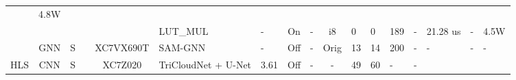 \begin{table}
\begin{adjustbox}{totalheight=\baselineskip,}
\begin{tabular}{ccccclp{2em}cp{3em}cp{2em}p{4em}p{3em}p{3.5em}p{3.5em}p{2.5em}p{3em}}
                                                               &\multirow{1}{*}{4.8W}\\
   &   &   &   &   &\multirow{1}{*}{LUT\_MUL}
                       &\multirow{1}{*}{-}
                           &\multirow{1}{*}{On}
                               &\multirow{1}{*}{-}
                                   &\multirow{1}{*}{i8}
                                       &\multirow{1}{*}{0}
                                           &\multirow{1}{*}{0}
                                               &\multirow{1}{*}{189}
                                                   &\multirow{1}{*}{-}
                                                       &\multirow{1}{*}{21.28 us}
                                                           &\multirow{1}{*}{-}
                                                               &\multirow{1}{*}{4.5W}\\
\cmidrule{2-17}
   &\multirow{1}{*}{GNN}
       &\multirow{1}{*}{S}
           &\multirow{1}{*}{\cite{chellaswamyFPGAbasedRemoteTarget2024}}
               &\multirow{1}{*}{XC7VX690T}
                   &\multirow{1}{*}{SAM-GNN}
                       &\multirow{1}{*}{-}
                           &\multirow{1}{*}{Off}
                               &\multirow{1}{*}{-}
                                   &\multirow{1}{*}{Orig}
                                       &\multirow{1}{*}{13}
                                           &\multirow{1}{*}{14}
                                               &\multirow{1}{*}{200}
                                                   &\multirow{1}{*}{-}
                                                       &\multirow{1}{*}{-}
                                                           &\multirow{1}{*}{-}
                                                               &\multirow{1}{*}{-}\\
\cmidrule{1-17}
\multirow{11}{*}{HLS}
   &\multirow{8}{*}{CNN}
       &\multirow{5}{*}{S}
           &\multirow{1}{*}{\cite{kimOnOrbitAICloud2024}}
               &\multirow{1}{*}{XC7Z020}
                   &\multirow{1}{*}{TriCloudNet + U-Net}
                       &\multirow{1}{*}{3.61}
                           &\multirow{1}{*}{Off}
                               &\multirow{1}{*}{-}
                                   &\multirow{1}{*}{-}
                                       &\multirow{1}{*}{49}
                                           &\multirow{1}{*}{60}
                                               &\multirow{1}{*}{-}
                                                   &\multirow{1}{*}{-}

\end{tabular}
\end{adjustbox}
\end{table}
